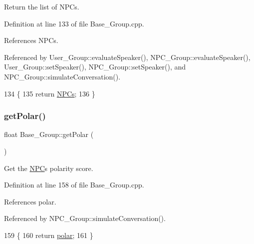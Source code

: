 Return the list of N\+P\+Cs. 



Definition at line 133 of file Base\+\_\+\+Group.\+cpp.



References N\+P\+Cs.



Referenced by User\+\_\+\+Group\+::evaluate\+Speaker(), N\+P\+C\+\_\+\+Group\+::evaluate\+Speaker(), User\+\_\+\+Group\+::set\+Speaker(), N\+P\+C\+\_\+\+Group\+::set\+Speaker(), and N\+P\+C\+\_\+\+Group\+::simulate\+Conversation().


\begin{DoxyCode}
134 \{
135     \textcolor{keywordflow}{return} \hyperlink{class_base___group_a4757f3c06c73eea029f71b871c1d863e}{NPCs};
136 \}
\end{DoxyCode}
\mbox{\label{class_base___group_a57cd8ebf1eee11eab80816ee87223f36}} 
\subsubsection{\texorpdfstring{get\+Polar()}{getPolar()}}
{\footnotesize\ttfamily float Base\+\_\+\+Group\+::get\+Polar (\begin{DoxyParamCaption}{ }\end{DoxyParamCaption})}



Get the \hyperlink{class_n_p_c}{N\+PC}\textquotesingle{}s polarity score. 



Definition at line 158 of file Base\+\_\+\+Group.\+cpp.



References polar.



Referenced by N\+P\+C\+\_\+\+Group\+::simulate\+Conversation().


\begin{DoxyCode}
159 \{
160     \textcolor{keywordflow}{return} \hyperlink{class_base___group_a0c2dfa52ac107ec9564bfc42917e8ce0}{polar};
161 \}
\end{DoxyCode}
\mbox{\label{class_base___group_a3864a2806457151363344051f2814389}} 
